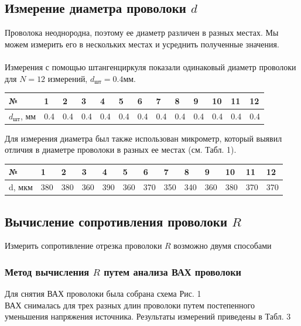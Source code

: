 \documentclass{article}
\begin{document}
	\subsection{Измерение диаметра проволоки $d$}
	Проволока неоднородна, поэтому ее диаметр различен в разных местах. Мы можем измерить его в нескольких местах и усреднить полученные значения.\\\\
	Измерения с помощью штангенциркуля показали одинаковый диаметр проволоки для $N = 12$ измерений, $d_{\text{шт}} = 0.4 \text{мм}$.\\
	\begin{table}[!ht]
		\centering
		\begin{tabular}{|l|l|l|l|l|l|l|l|l|l|l|l|l|}
			\hline
			№ & 1 & 2 & 3 & 4 & 5 & 6 & 7 & 8 & 9 & 10 & 11 & 12 \\ \hline
			$d_{\text{шт}}$, мм & 0.4 & 0.4 & 0.4 & 0.4 & 0.4 & 0.4 & 0.4 & 0.4 & 0.4 & 0.4 & 0.4 & 0.4 \\ \hline
		\end{tabular}
	\end{table}
	Для измерения диаметра был также использован микрометр, который выявил отличия в диаметре проволоки в разных ее местах (см. Табл. 1).
	\begin{table}[!ht]
		\centering
		\begin{tabular}{|l|l|l|l|l|l|l|l|l|l|l|l|l|}
			\hline
			№ & 1 & 2 & 3 & 4 & 5 & 6 & 7 & 8 & 9 & 10 & 11 & 12 \\ \hline
			d, мкм & 380 & 380 & 360 & 390 & 360 & 370 & 350 & 340 & 360 & 380 & 370 & 370 \\ \hline
		\end{tabular}
	\end{table}
	
	\subsection{Вычисление сопротивления проволоки $R$}
	Измерить сопротивление отрезка проволоки $R$ возможно двумя способами
	
	\subsubsection{Метод вычисления $R$ путем анализа ВАХ проволоки}
	Для снятия ВАХ проволоки была собрана схема Рис. 1\\
	ВАХ снималась для трех разных длин проволоки путем постепенного уменьшения напряжения источника. Результаты измерений приведены в Табл. 3
	\\
	
\end{document}
